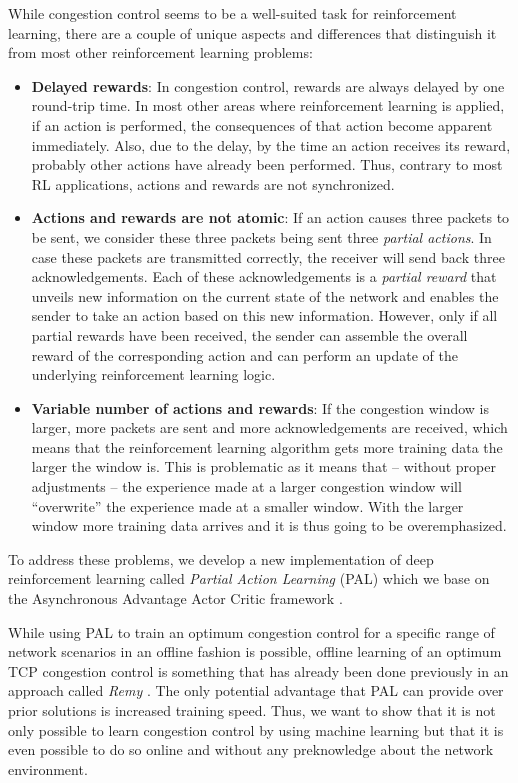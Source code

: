\documentclass[10pt,sigconf,anonymous]{acmart}
\begin{document}
While congestion control seems to be a well-suited task for reinforcement learning, there are a couple of unique aspects and differences that distinguish it from most other reinforcement learning problems:  \begin{itemize}
\item \textbf{Delayed rewards}: In congestion control, rewards are always delayed by one round-trip time. In most other areas where reinforcement learning is applied, if an action is performed, the consequences of that action become apparent immediately. Also, due to the delay, by the time an action receives its reward, probably other actions have already been performed. Thus, contrary to most RL applications, actions and rewards are not synchronized. 
\item \textbf{Actions and rewards are not atomic}: If an action causes three packets to be sent, we consider these three packets being sent three \textit{partial actions}. In case these packets are transmitted correctly, the receiver will send back three acknowledgements. Each of these acknowledgements is a \textit{partial reward} that unveils new information on the current state of the network and enables the sender to take an action based on this new information. However, only if all partial rewards have been received, the sender can assemble the overall reward of the corresponding action and can perform an update of the underlying reinforcement learning logic. 
\item \textbf{Variable number of actions and rewards}: If the congestion window is larger, more packets are sent and more acknowledgements are received, which means that the reinforcement learning algorithm gets more training data the larger the window is. This is problematic as it means that -- without proper adjustments -- the experience made at a larger congestion window will ``overwrite'' the experience made at a smaller window. With the larger window more training data arrives and it is thus going to be overemphasized. 
\end{itemize}

To address these problems, we develop a new implementation of deep reinforcement learning called \textit{Partial Action Learning} (PAL) which we base on the Asynchronous Advantage Actor Critic framework \cite{mnih_asynchronous_2016}. 

While using PAL to train an optimum congestion control for a specific range of network scenarios in an offline fashion is possible, offline learning of an optimum TCP congestion control is something that has already been done previously in an approach called \textit{Remy} \citep{winstein_tcp_2013}. The only potential advantage that PAL can provide over prior solutions is increased training speed. Thus, we want to show that it is  not only possible to learn congestion control by using machine learning but that it is even possible to do so online and without any preknowledge about the network environment.
\end{document}
